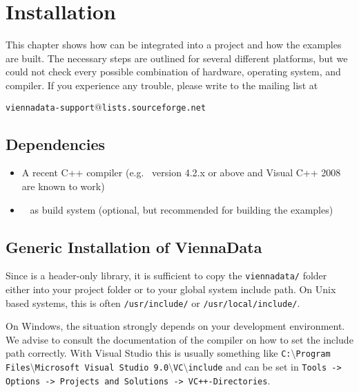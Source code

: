 \chapter{Installation}

This chapter shows how {\ViennaData} can be integrated into a project and how
the examples are built. The necessary steps are outlined for several different
platforms, but we could not check every possible combination of hardware,
operating system, and compiler. If you experience any trouble, please write to
the mailing list at \\
\begin{center}
\texttt{viennadata-support$@$lists.sourceforge.net} 
\end{center}


\section{Dependencies}
\label{dependencies}

\begin{itemize}
 \item A recent C++ compiler (e.g.~{\GCC} version 4.2.x or above and Visual C++
2008 are known to work)
 \item {\CMake}~\cite{cmake} as build system (optional, but recommended
for building the examples)
\end{itemize}


\section{Generic Installation of ViennaData} \label{sec:viennacl-installation}
Since {\ViennaData} is a header-only library, it is sufficient to copy the 
\lstinline|viennadata/| folder either into your project folder or to your global system
include path. On Unix based systems, this is often \lstinline|/usr/include/| or
\lstinline|/usr/local/include/|.

On Windows, the situation strongly depends on your development environment. We
advise to consult the documentation of the compiler on how to set the include
path correctly. With Visual Studio this is usually something like
\texttt{C:$\setminus$Program Files$\setminus$Microsoft Visual Studio
9.0$\setminus$VC$\setminus$include}
and can be set in \texttt{Tools -> Options -> Projects and Solutions ->
VC++-\-Directories}. 


